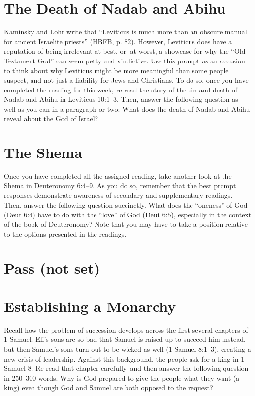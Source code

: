 \documentclass[12pt]{article}
\begin{document}
\section{The Death of Nadab and Abihu}

Kaminsky and Lohr write that “Leviticus is much more than an obscure manual for ancient Israelite priests” (HBFB, p. 82). However, Leviticus does have a reputation of being irrelevant at best, or, at worst, a showcase for why the “Old Testament God” can seem petty and vindictive. Use this prompt as an occasion to think about why Leviticus might be more meaningful than some people suspect, and not just a liability for Jews and Christians. To do so, once you have completed the reading for this week, re-read the story of the sin and death of Nadab and Abihu in Leviticus 10:1–3. Then, answer the following question as well as you can in a paragraph or two: What does the death of Nadab and Abihu reveal about the God of Israel?


\section{The Shema}

Once you have completed all the assigned reading, take another look at the Shema in Deuteronomy 6:4–9. As you do so, remember that the best prompt responses demonstrate awareness of secondary and supplementary readings. Then, answer the following question succinctly. What does the “oneness” of God (Deut 6:4) have to do with the “love” of God (Deut 6:5), especially in the context of the book of Deuteronomy? Note that you may have to take a position relative to the options presented in the readings.


\section{Pass (not set)}


\section{Establishing a Monarchy}

Recall how the problem of succession develops across the first several chapters of 1 Samuel. Eli’s sons are so bad that Samuel is raised up to succeed him instead, but then Samuel’s sons turn out to be wicked as well (1 Samuel 8:1–3), creating a new crisis of leadership. Against this background, the people ask for a king in 1 Samuel 8. Re-read that chapter carefully, and then answer the following question in 250–300 words. Why is God prepared to give the people what they want (a king) even though God and Samuel are both opposed to the request?
\end{document}

